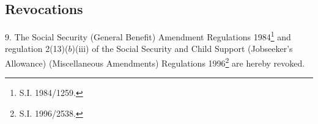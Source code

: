 \documentclass[12pt,a4paper]{article}
\begin{document}
%
%
%
%
%
%
%


\subsection[9. Revocations]{Revocations}

9.  The Social Security (General Benefit) Amendment Regulations 1984\footnote{\frenchspacing S.I. 1984/1259.} and regulation 2(13)($b$)(iii) of the Social Security and Child Support (Jobseeker’s Allowance) (Miscellaneous Amendments) Regulations 1996\footnote{\frenchspacing S.I. 1996/2538.} are hereby revoked. 
\end{document}

